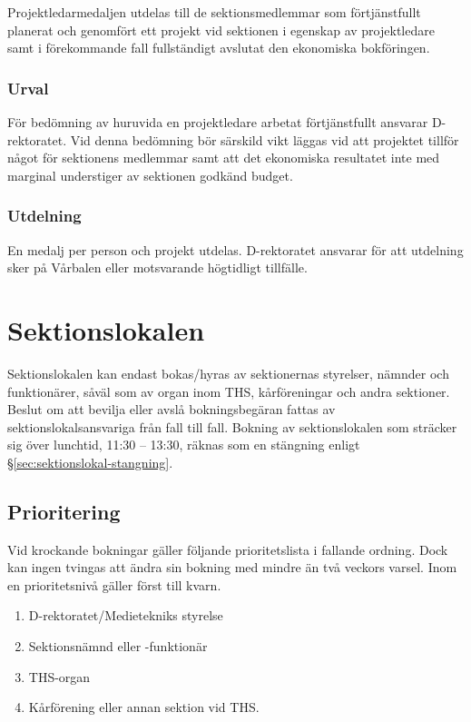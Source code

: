 \documentclass{dgovdoc}
\begin{document}
Projektledarmedaljen utdelas till de sektionsmedlemmar som förtjänstfullt
planerat och genomfört ett projekt vid sektionen i egenskap av projektledare
samt i förekommande fall fullständigt avslutat den ekonomiska bokföringen.

\subsubsection{Urval}

För bedömning av huruvida en projektledare arbetat förtjänstfullt ansvarar
D-rektoratet. Vid denna bedömning bör särskild vikt läggas vid att projektet
tillför något för sektionens medlemmar samt att det ekonomiska resultatet inte
med marginal understiger av sektionen godkänd budget.

\subsubsection{Utdelning}

En medalj per person och projekt utdelas. D-rektoratet ansvarar för att utdelning sker på Vårbalen eller motsvarande högtidligt tillfälle.

\section{Sektionslokalen}

Sektionslokalen kan endast bokas/hyras av sektionernas styrelser, nämnder och
funktionärer, såväl som av organ inom THS, kårföreningar och andra sektioner.
Beslut om att bevilja eller avslå bokningsbegäran fattas av
sektionslokalsansvariga från fall till fall. Bokning av sektionslokalen som
sträcker sig över lunchtid, 11:30 -- 13:30, räknas som en stängning enligt
\S\ref{sec:sektionslokal-stangning}.

\subsection{Prioritering}

Vid krockande bokningar gäller följande prioritetslista i fallande ordning.
Dock kan ingen tvingas att ändra sin bokning med mindre än två veckors varsel.
Inom en prioritetsnivå gäller först till kvarn.

\begin{enumerate}
  \item D-rektoratet/Medietekniks styrelse
  \item Sektionsnämnd eller -funktionär
  \item THS-organ
  \item Kårförening eller annan sektion vid THS.
\end{enumerate}
\end{document}
